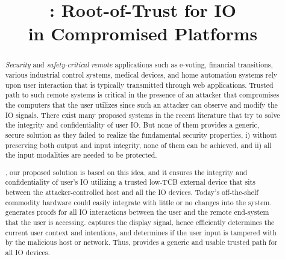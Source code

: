 \newif\ifccs
\ccsfalse

\ifccs

\else

\fi



\newif\ifdesperatetime

\graphicspath{{images/}}


\title{\name: Root-of-Trust for IO \\ in Compromised Platforms}

\ifccs
\else
\maketitle
\fi

\begin{abstract}
 

\emph{Security} and \emph{safety-critical} \emph{remote} applications such as e-voting, financial transitions, various industrial control systems, medical devices, and home automation systems rely upon user interaction that is typically transmitted through web applications. Trusted path to such remote systems is critical in the presence of an attacker that compromises the computers that the user utilizes since such an attacker can observe and modify the IO signals. There exist many proposed systems in the recent literature that try to solve the integrity and confidentiality of user IO. But none of them provides a generic, secure solution as they failed to realize the fundamental security properties, i) without preserving both output and input integrity, none of them can be achieved, and ii) all the input modalities are needed to be protected.    

\name, our proposed solution is based on this idea, and it ensures the integrity and confidentiality of user's IO utilizing a trusted low-TCB external device that sits between the attacker-controlled host and all the IO devices. Today's off-the-shelf commodity hardware could easily integrate \name with little or no changes into the system. \name generates proofs for all IO interactions between the user and the remote end-system that the user is accessing. \name captures the display signal, hence efficiently determines the current user context and intentions, and determines if the user input is tampered with by the malicious host or network. Thus, \name provides a generic and usable trusted path for all IO devices. 


\end{abstract}
